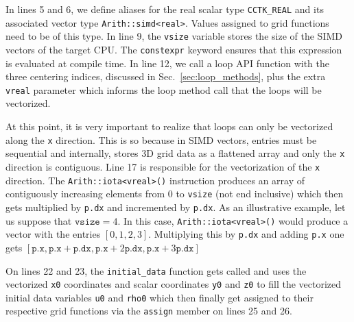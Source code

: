 In lines 5 and 6, we define aliases for the real scalar type \texttt{CCTK\_REAL} and its associated vector type \texttt{Arith::simd<real>}. Values assigned to grid functions need to be of this type. In line 9, the \texttt{vsize} variable stores the size of the SIMD vectors of the target CPU. The \texttt{constexpr} keyword ensures that this expression is evaluated at compile time. In line 12, we call a loop API function with the three centering indices, discussed in Sec.~\ref{sec:loop_methods}, plus the extra \texttt{vreal} parameter which informs the loop method call that the loops will be vectorized.

At this point, it is very important to realize that loops can only be vectorized along the \texttt{x} direction. This is so because in SIMD vectors, entries must be sequential and internally, \CarpetX stores 3D grid data as a flattened array and only the \texttt{x} direction is contiguous. Line 17 is responsible for the vectorization of the \texttt{x} direction. The \texttt{Arith::iota<vreal>()} instruction produces an array of contiguously increasing elements from 0 to \texttt{vsize} (not end inclusive) which then gets multiplied by \texttt{p.dx} and incremented by \texttt{p.dx}. As an illustrative example, let us suppose that $\texttt{vsize} = 4$. In this case, \texttt{Arith::iota<vreal>()} would produce a vector with the entries $[0,1,2,3]$. Multiplying this by \texttt{p.dx} and adding \texttt{p.x} one gets $[\texttt{p.x}, \texttt{p.x} + \texttt{p.dx}, \texttt{p.x} + 2\texttt{p.dx}, \texttt{p.x} + 3\texttt{p.dx}]$

On lines 22 and 23, the \texttt{initial\_data} function gets called and uses the vectorized \texttt{x0} coordinates and scalar coordinates \texttt{y0} and \texttt{z0} to fill the vectorized initial data variables \texttt{u0} and \texttt{rho0} which then finally get assigned to their respective grid functions via the \texttt{assign} member on lines 25 and 26.


